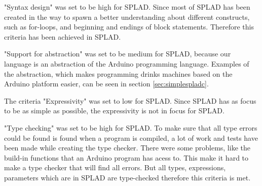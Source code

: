 "Syntax design" was set to be high for SPLAD. Since most of SPLAD has been created in the way to spawn a better understanding about different constructs, such as for-loops, and beginning and endings of block statements. Therefore this criteria has been achieved in SPLAD.

"Support for abstraction" was set to be medium for SPLAD, because our language is an abstraction of the Arduino programming language. Examples of the abstraction, which makes programming drinks machines based on the Arduino platform easier, can be seen in section \ref{sec:simplespladc}.

The criteria "Expressivity" was set to low for SPLAD. Since SPLAD has as focus to be as simple as possible, the expressivity is not in focus for SPLAD. 

"Type checking" was set to be high for SPLAD. To make sure that all type errors could be found is found when a program is compiled, a lot of work and tests have been made while creating the type checker. There were some problems, like the build-in functions that an Arduino program has acess to. This make it hard to make a type checker that will find all errors. But all types, expressions, parameters which are in SPLAD are type-checked  therefore this criteria is met. 